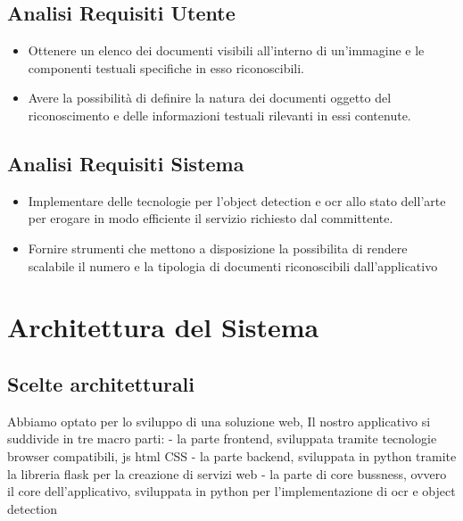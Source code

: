 \documentclass[12pt,a4paper]{article}
\begin{document}
\subsection{Analisi Requisiti Utente}

\begin{itemize}
    \item Ottenere un elenco dei documenti visibili all'interno di
        un'immagine e le componenti testuali specifiche in esso
        riconoscibili.
    \item Avere la possibilità di definire la natura dei documenti
        oggetto del riconoscimento e delle informazioni testuali
        rilevanti in essi contenute.
\end{itemize}

\subsection{Analisi Requisiti Sistema}

\begin{itemize}
    \item Implementare delle tecnologie per l'object detection e ocr allo stato dell'arte per
    erogare in modo efficiente il servizio richiesto dal committente.
    \item Fornire strumenti che mettono a disposizione la possibilita di rendere scalabile il numero
    e la tipologia di documenti riconoscibili dall'applicativo
\end{itemize}

\section{Architettura del Sistema}

\subsection{Scelte architetturali}

Abbiamo optato per lo sviluppo di una soluzione web, Il nostro applicativo si suddivide in tre macro parti:
- la parte frontend, sviluppata tramite tecnologie browser compatibili, js html CSS
- la parte backend, sviluppata in python tramite la libreria flask per la creazione di servizi web
- la parte di core bussness, ovvero il core dell'applicativo, sviluppata in python per l'implementazione di ocr e object detection
\end{document}
